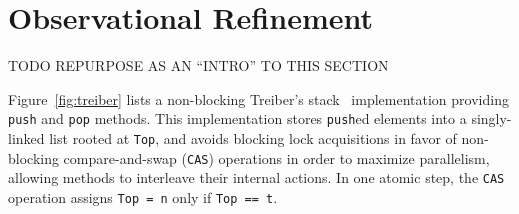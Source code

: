 
\section{Observational Refinement}
\label{sec:refinement}

TODO REPURPOSE AS AN ``INTRO'' TO THIS SECTION

Figure~\ref{fig:treiber} lists a non-blocking Treiber's stack~\cite{tr/Treiber86}
implementation providing {\tt push} and {\tt pop} methods. This implementation
stores {\tt push}ed elements into a singly-linked list rooted at {\tt Top}, and
avoids blocking lock acquisitions in favor of non-blocking compare-and-swap
({\tt CAS}) operations in order to maximize parallelism, allowing methods to
interleave their internal actions. In one atomic step, the {\tt CAS} operation
assigns {\tt Top = n} only if {\tt Top == t}.


